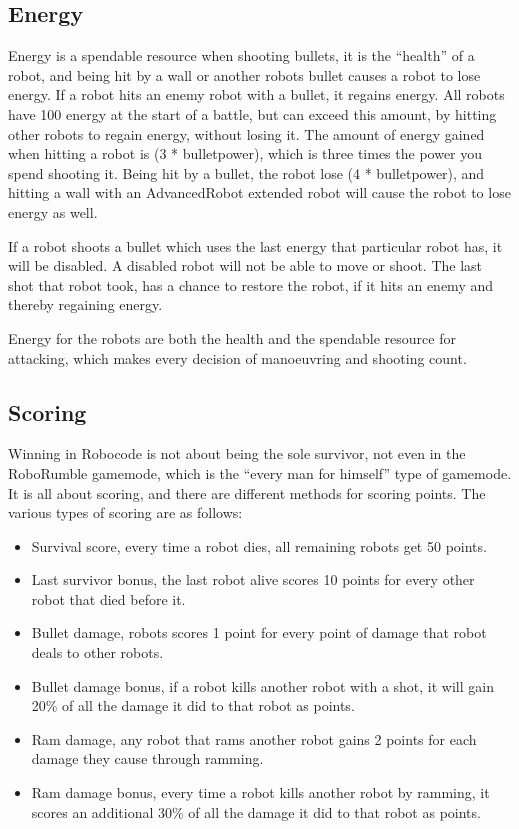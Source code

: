 \subsection{Energy}
Energy is a spendable resource when shooting bullets, it is the “health” of a robot, and being hit by a wall or another robots bullet causes a robot to lose energy. If a robot hits an enemy robot with a bullet, it regains energy. All robots have 100 energy at the start of a battle, but can exceed this amount, by hitting other robots to regain energy, without losing it. The amount of energy gained when hitting a robot is (3 * bulletpower), which is three times the power you spend shooting it. Being hit by a bullet, the robot lose (4 * bulletpower), and hitting a wall with an AdvancedRobot extended robot will cause the robot to lose energy as well.

If a robot shoots a bullet which uses the last energy that particular robot has, it will be disabled. A disabled robot will not be able to move or shoot. The last shot that robot took, has a chance to restore the robot, if it hits an enemy and thereby regaining energy.
   
Energy for the robots are both the health and the spendable resource for attacking, which makes every decision of manoeuvring and shooting count.

\subsection{Scoring}
Winning in Robocode is not about being the sole survivor, not even in the RoboRumble gamemode, which is the “every man for himself” type of gamemode. It is all about scoring, and there are different methods for scoring points. The various types of scoring are as follows:
\begin{itemize}
\item Survival score, every time a robot dies, all remaining robots get 50 points.
\item Last survivor bonus, the last robot alive scores 10 points for every other robot that died before it.
\item Bullet damage, robots scores 1 point for every point of damage that robot deals to other robots.
\item Bullet damage bonus, if a robot kills another robot with a shot, it will gain 20\% of all the damage it did to that robot as points.
\item Ram damage, any robot that rams another robot gains 2 points for each damage they cause through ramming.
\item Ram damage bonus, every time a robot kills another robot by ramming, it scores an additional 30\% of all the damage it did to that robot as points.
\end{itemize}

